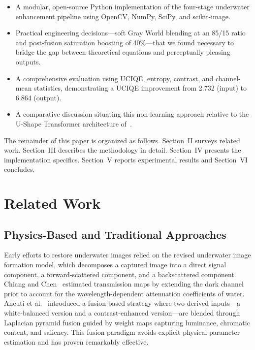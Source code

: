 \documentclass[conference]{IEEEtran}
\begin{document}
\begin{itemize}
    \item A modular, open-source Python implementation of the four-stage underwater enhancement pipeline using OpenCV, NumPy, SciPy, and scikit-image.
    \item Practical engineering decisions---soft Gray World blending at an 85/15 ratio and post-fusion saturation boosting of 40\%---that we found necessary to bridge the gap between theoretical equations and perceptually pleasing outputs.
    \item A comprehensive evaluation using UCIQE, entropy, contrast, and channel-mean statistics, demonstrating a UCIQE improvement from 2.732 (input) to 6.864 (output).
    \item A comparative discussion situating this non-learning approach relative to the U-Shape Transformer architecture of~\cite{peng2023ushape}.
\end{itemize}

The remainder of this paper is organized as follows. Section~II surveys related work. Section~III describes the methodology in detail. Section~IV presents the implementation specifics. Section~V reports experimental results and Section~VI concludes.

\section{Related Work}

\subsection{Physics-Based and Traditional Approaches}

Early efforts to restore underwater images relied on the revised underwater image formation model, which decomposes a captured image into a direct signal component, a forward-scattered component, and a backscattered component. Chiang and Chen~\cite{chiang2012} estimated transmission maps by extending the dark channel prior to account for the wavelength-dependent attenuation coefficients of water. Ancuti et al.~\cite{ancuti2012} introduced a fusion-based strategy where two derived inputs---a white-balanced version and a contrast-enhanced version---are blended through Laplacian pyramid fusion guided by weight maps capturing luminance, chromatic content, and saliency. This fusion paradigm avoids explicit physical parameter estimation and has proven remarkably effective.
\end{document}
